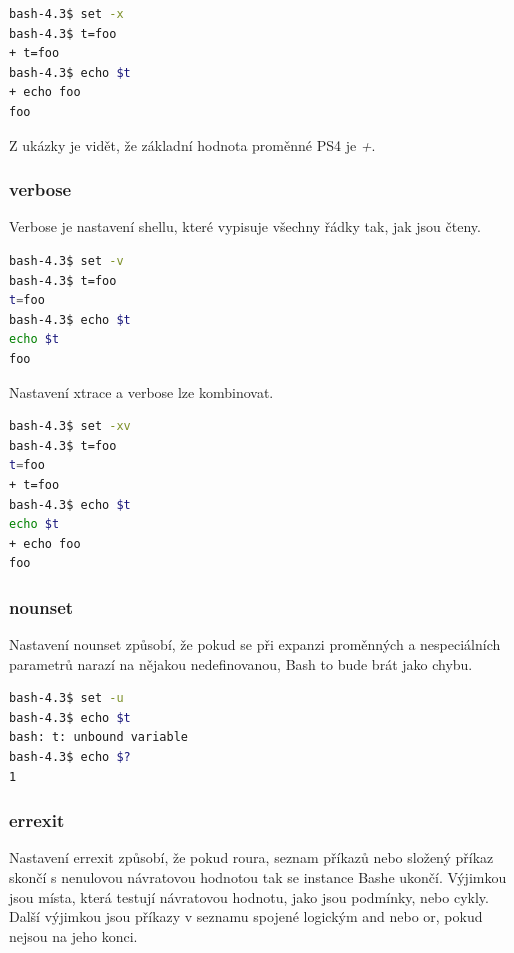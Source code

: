 \documentclass[thesis=M,czech]{FITthesis}[2012/06/26]
\begin{document}
\begin{lstlisting}[language=bash, caption={Výstup z knihovny Bashlex}, label={lst:bashlex}]
bash-4.3$ set -x
bash-4.3$ t=foo
+ t=foo
bash-4.3$ echo $t
+ echo foo
foo
\end{lstlisting}

Z ukázky je vidět, že základní hodnota proměnné PS4 je \textit{+}.

\subsubsection{verbose}

Verbose je nastavení shellu, které vypisuje všechny řádky tak, jak jsou čteny.

\begin{lstlisting}[language=bash, caption={Výstup z knihovny Bashlex}, label={lst:bashlex}]
bash-4.3$ set -v
bash-4.3$ t=foo
t=foo
bash-4.3$ echo $t
echo $t
foo
\end{lstlisting}

Nastavení xtrace a verbose lze kombinovat.

\begin{lstlisting}[language=bash, caption={Výstup z knihovny Bashlex}, label={lst:bashlex}]
bash-4.3$ set -xv
bash-4.3$ t=foo
t=foo
+ t=foo
bash-4.3$ echo $t
echo $t
+ echo foo
foo
\end{lstlisting}


\subsubsection{nounset}

Nastavení nounset způsobí, že pokud se při expanzi proměnných a nespeciálních parametrů narazí na nějakou nedefinovanou, Bash to bude brát jako chybu.

\begin{lstlisting}[language=bash, caption={nounset}, label={lst:unbound}]
bash-4.3$ set -u
bash-4.3$ echo $t
bash: t: unbound variable
bash-4.3$ echo $?
1
\end{lstlisting}


\subsubsection{errexit}

Nastavení errexit způsobí, že pokud roura, seznam příkazů nebo složený příkaz skončí s nenulovou návratovou hodnotou tak se instance Bashe ukončí. Výjimkou jsou místa, která testují návratovou hodnotu, jako jsou podmínky, nebo cykly. Další výjimkou jsou příkazy v seznamu spojené logickým and nebo or, pokud nejsou na jeho konci.
\end{document}
